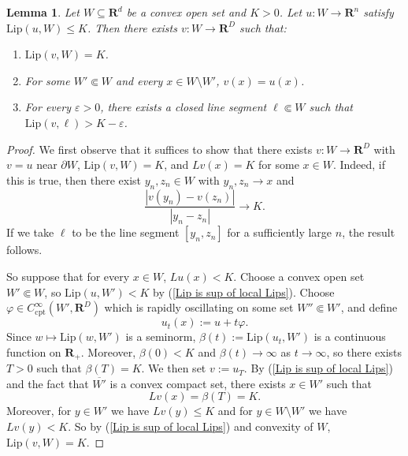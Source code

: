 \documentclass[reqno,11pt]{amsart}
\newcommand{\RR}{\mathbf{R}}
\newcommand{\Lip}{\mathrm{Lip}}
\newcommand{\cpt}{\mathrm{cpt}}
\newtheorem{lemma}[theorem]{Lemma}
\theoremstyle{definition}
\numberwithin{equation}{section}
\begin{document}
\begin{lemma}\label{improvement on one ball}
Let $W \subseteq \RR^d$ be a convex open set and $K > 0$.
Let $u: W \to \RR^n$ satisfy $\Lip(u, W) \leq K$.
Then there exists $v: W \to \RR^D$ such that:
\begin{enumerate}
\item $\Lip(v, W) = K$.
\item For some $W' \Subset W$ and every $x \in W \setminus W'$, $v(x) = u(x)$.
\item For every $\varepsilon > 0$, there exists a closed line segment $\ell \Subset W$ such that $\Lip(v, \ell) > K - \varepsilon$.
\end{enumerate}
\end{lemma}
\begin{proof}
We first observe that it suffices to show that there exists $v: W \to \RR^D$ with $v = u$ near $\partial W$, $\Lip(v, W) = K$, and $Lv(x) = K$ for some $x \in W$.
Indeed, if this is true, then there exist $y_n, z_n \in W$ with $y_n, z_n \to x$ and
$$\frac{|v(y_n) - v(z_n)|}{|y_n - z_n|} \to K.$$
If we take $\ell$ to be the line segment $[y_n, z_n]$ for a sufficiently large $n$, the result follows.

So suppose that for every $x \in W$, $Lu(x) < K$.
Choose a convex open set $W' \Subset W$, so $\Lip(u, W') < K$ by (\ref{Lip is sup of local Lips}).
Choose $\varphi \in C^\infty_\cpt(W', \RR^D)$ which is rapidly oscillating on some set $W'' \Subset W'$, and define
$$u_t(x) := u + t\varphi.$$
Since $w \mapsto \Lip(w, W')$ is a seminorm, $\beta(t) := \Lip(u_t, W')$ is a continuous function on $\RR_+$.
Moreover, $\beta(0) < K$ and $\beta(t) \to \infty$ as $t \to \infty$, so there exists $T > 0$ such that $\beta(T) = K$.
We then set $v := u_T$.
By (\ref{Lip is sup of local Lips}) and the fact that $\overline{W'}$ is a convex compact set, there exists $x \in W'$ such that
$$Lv(x) = \beta(T) = K.$$
Moreover, for $y \in W'$ we have $Lv(y) \leq K$ and for $y \in W \setminus W'$ we have $Lv(y) < K$.
So by (\ref{Lip is sup of local Lips}) and convexity of $W$, $\Lip(v, W) = K$.
\end{proof}
\end{document}
